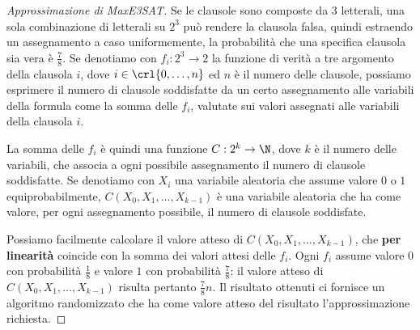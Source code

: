 \documentclass[\main/main.tex]{subfiles}
\begin{document}
\begin{proof}[Approssimazione di MaxE3SAT]
    Se le clausole sono composte da \(3\) letterali, una sola combinazione di letterali su \(2^3\) può rendere la clausola falsa, quindi estraendo un assegnamento a caso uniformemente, la probabilità che una specifica clausola sia vera è \(\frac{7}{8}\). Se denotiamo con \(f_i: 2^3 \rightarrow 2\) la funzione di verità a tre argomento della clausola \(i\), dove \(i \in \crl{0, \ldots, n}\) ed \(n\) è il numero delle clausole, possiamo esprimere il numero di clausole soddisfatte da un certo assegnamento alle variabili della formula come la somma delle \(f_i\), valutate sui valori assegnati alle variabili della clausola \(i\).
    
    La somma delle \(f_i\) è quindi una funzione \(C: 2^k \rightarrow \N\), dove \(k\) è il numero delle variabili, che associa a ogni possibile assegnamento il numero di clausole soddisfatte. Se denotiamo con \(X_i\) una variabile aleatoria che assume valore \(0\) o \(1\) equiprobabilmente, \(C\left(X_{0}, X_{1}, \ldots, X_{k-1}\right)\) è una variabile aleatoria che ha come valore, per ogni assegnamento possibile, il numero di clausole soddisfate.
    
    Possiamo facilmente calcolare il valore atteso di \(C\left(X_{0}, X_{1}, \ldots, X_{k-1}\right)\), che \textbf{per linearità} coincide con la somma dei valori attesi delle \(f_i\). Ogni \(f_i\) assume valore \(0\) con probabilità \(\frac{1}{8}\) e valore \(1\) con probabilità \(\frac{7}{8}\): il valore atteso di \(C\left(X_{0}, X_{1}, \ldots, X_{k-1}\right)\) risulta pertanto \(\frac{7}{8}n\). Il risultato ottenuti ci fornisce un algoritmo randomizzato che ha come valore atteso del risultato l'approssimazione richiesta.
    

\end{proof}
\end{document}
